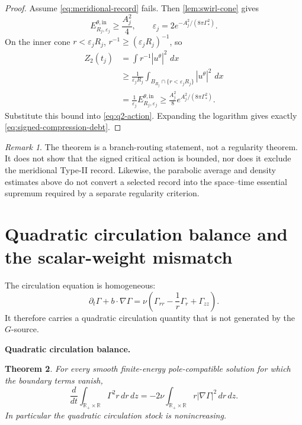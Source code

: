 \documentclass[11pt]{article}
\newtheorem{theorem}{Theorem}[section]
\theoremstyle{definition}\newtheorem{definition}[theorem]{Definition}
\theoremstyle{remark}\newtheorem{remark}[theorem]{Remark}
\newcommand{\R}{\mathbb R}\newcommand{\dd}{\,d}\newcommand{\HH}{\mathcal H}
\begin{document}
\begin{proof}
Assume \eqref{eq:meridional-record} fails.  Then \cref{lem:swirl-cone} gives
\[
 E_{R_j,\varepsilon_j}^{\theta,\mathrm{in}}
 \ge\frac{A_j^2}{4},
 \qquad
 \varepsilon_j
 =
 2e^{-A_j^2/(8\pi\Gamma_*^2)}.
\]
On the inner cone \(r<\varepsilon_jR_j\),
\(r^{-1}\ge(\varepsilon_jR_j)^{-1}\), so
\[
 \begin{aligned}
 Z_2(t_j)
 &=\int r^{-1}|u^\theta|^2\,\dd x\\
 &\ge
 \frac1{\varepsilon_jR_j}
 \int_{B_{R_j}\cap\{r<\varepsilon_jR_j\}}
 |u^\theta|^2\,\dd x\\
 &=
 \frac1{\varepsilon_j}
 E_{R_j,\varepsilon_j}^{\theta,\mathrm{in}}
 \ge
 \frac{A_j^2}{8}
 e^{A_j^2/(8\pi\Gamma_*^2)}.
 \end{aligned}
\]
Substitute this bound into \eqref{eq:q2-action}.  Expanding the logarithm gives
exactly \eqref{eq:signed-compression-debt}.
\end{proof}

\begin{remark}
The theorem is a branch-routing statement, not a regularity theorem.  It does
not show that the signed critical action is bounded, nor does it exclude the
meridional Type-II record.  Likewise, the parabolic average and density
estimates above do not convert a selected record into the space--time
essential supremum required by a separate regularity criterion.
\end{remark}


\section{Quadratic circulation balance and the scalar-weight mismatch}
\label{sec:circulation-owner}

The circulation equation is homogeneous:
\[
 \partial_t\Gamma+b\cdot\nabla\Gamma
 =\nu\left(\Gamma_{rr}-\frac1r\Gamma_r+\Gamma_{zz}\right).
\]
It therefore carries a quadratic circulation quantity that is not generated by the $G$-source.

\medskip
\noindent\textbf{Quadratic circulation balance.}
\begin{theorem}
For every smooth finite-energy pole-compatible solution for which the boundary
terms vanish,
\[
 \boxed{
 \frac d{dt}\int_{\R_+\times\R}\Gamma^2r\,dr\,dz
 =-2\nu\int_{\R_+\times\R}r|\nabla\Gamma|^2\,dr\,dz.
 }
\]
In particular the quadratic circulation stock is nonincreasing.
\end{theorem}
\end{document}
